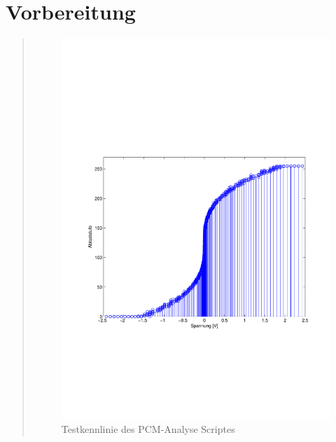 \section{Vorbereitung}
\begin{quote}
    
    
    \begin{figure}[H]
        \centering
        \includegraphics[scale=0.7, trim = 2cm 7cm 1cm 8cm, clip]{Bilder/PCM_Test}
        \caption{Testkennlinie des PCM-Analyse Scriptes}
        \label{fig:PCM_Test}
    \end{figure}
    
    
    
    
    
    
\end{quote}


